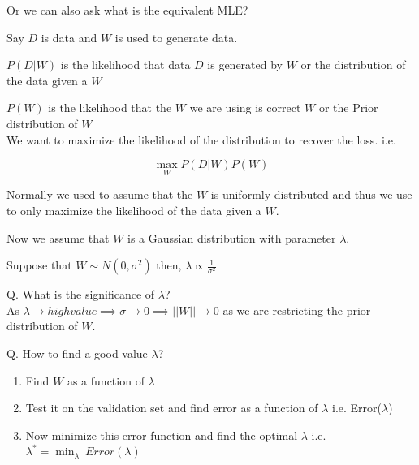 \documentclass[11pt, twosides]{article}
\begin{document}
Or we can also ask what is the equivalent MLE?

Say $D$ is data and $W$ is used to generate data.

$P(D|W)$ is the likelihood that data $D$ is generated by $W$ or the distribution of the data given a $W$

$P(W)$ is the likelihood that the $W$ we are using is correct $W$ or the Prior distribution of $W$\\


We want to maximize the likelihood of the distribution to recover the loss. i.e.

$$\max_W P(D|W)P(W)$$

Normally we used to assume that the $W$ is uniformly distributed and thus we use to only maximize the likelihood of the data given a $W$.

Now we assume that $W$ is a Gaussian distribution with parameter $\lambda$.

Suppose that $W \sim N(0,\sigma^2)$ then, $\lambda \propto \frac{1}{\sigma^2}$

\begin{flushleft}
Q. What is the significance of $\lambda$?\\
\color{blue}
As $\lambda \rightarrow high value \implies \sigma \rightarrow 0 \implies ||W|| \rightarrow 0$ as we are restricting the prior distribution of $W$. 
\end{flushleft}

\begin{flushleft}
Q. How to find a good value $\lambda$?\\
\color{blue}
\begin{enumerate}
    \item Find $W$ as a function of $\lambda$
    \item Test it on the validation set and find error as a function of $\lambda$ i.e. Error($\lambda$)
    \item Now minimize this error function and find the optimal $\lambda$ i.e. $\lambda^* = \min_\lambda \ Error(\lambda)$
\end{enumerate}
\end{flushleft}
\end{document}
